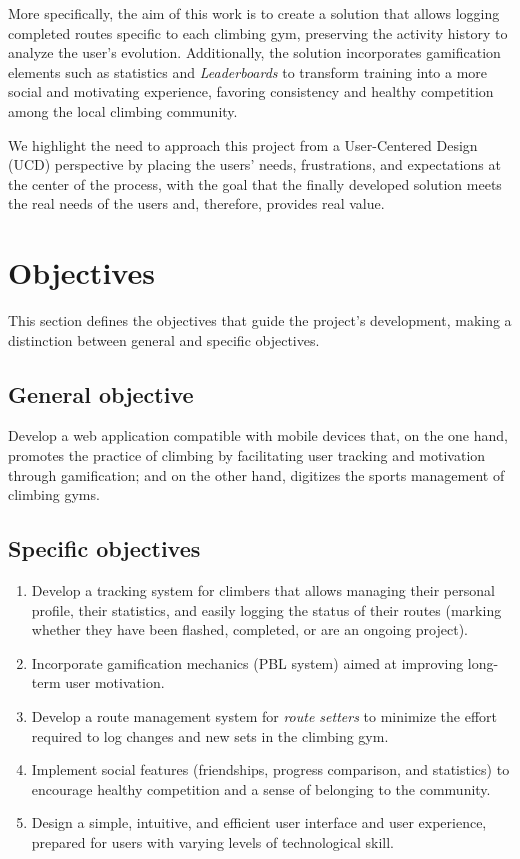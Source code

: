 More specifically, the aim of this work is to create a solution that allows logging completed routes specific to each climbing gym, preserving the activity history to analyze the user's evolution. Additionally, the solution incorporates gamification elements such as statistics and \textit{Leaderboards} to transform training into a more social and motivating experience, favoring consistency and healthy competition among the local climbing community.

We highlight the need to approach this project from a User-Centered Design (UCD) perspective by placing the users' needs, frustrations, and expectations at the center of the process, with the goal that the finally developed solution meets the real needs of the users and, therefore, provides real value.

\section{Objectives}

This section defines the objectives that guide the project's development, making a distinction between general and specific objectives.

\subsection{General objective}

Develop a web application compatible with mobile devices that, on the one hand, promotes the practice of climbing by facilitating user tracking and motivation through gamification; and on the other hand, digitizes the sports management of climbing gyms.

\subsection{Specific objectives}

\begin{enumerate}
	\item Develop a tracking system for climbers that allows managing their personal profile, their statistics, and easily logging the status of their routes (marking whether they have been flashed, completed, or are an ongoing project).
	\item Incorporate gamification mechanics (PBL system) aimed at improving long-term user motivation.
	\item Develop a route management system for \textit{route setters} to minimize the effort required to log changes and new sets in the climbing gym.
	\item Implement social features (friendships, progress comparison, and statistics) to encourage healthy competition and a sense of belonging to the community.
	\item Design a simple, intuitive, and efficient user interface and user experience, prepared for users with varying levels of technological skill.
\end{enumerate}

